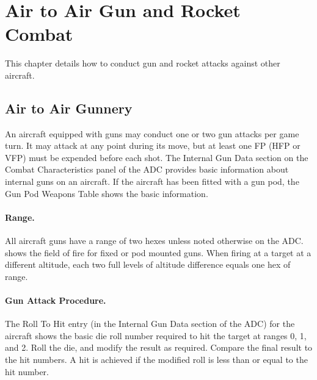 \section{Air to Air Gun and Rocket Combat}

This chapter details how to conduct gun and rocket attacks against other aircraft.

\subsection{Air to Air Gunnery}

An aircraft equipped with guns may conduct one or two gun attacks per game turn. It may attack at any point during its move, but at least one FP (HFP or VFP) must be expended before each shot. The Internal Gun Data section on the Combat Characteristics panel of the ADC provides basic information about internal guns on an aircraft. If the aircraft has been fitted with a gun pod, the Gun Pod Weapons Table shows the basic information.


\paragraph{Range.} All aircraft guns have a range of two hexes unless noted otherwise on the ADC.  shows the field of fire for fixed or pod mounted guns. When firing at a target at a different altitude, each two full levels of altitude difference equals one hex of range.


\paragraph{Gun Attack Procedure.} The Roll To Hit entry (in the Internal Gun Data section of the ADC) for the aircraft shows the basic die roll number required to hit the target at ranges 0, 1, and 2. Roll the die, and modify the result as required. Compare the final result to the hit numbers. A hit is achieved if the modified roll is less than or equal to the hit number.

